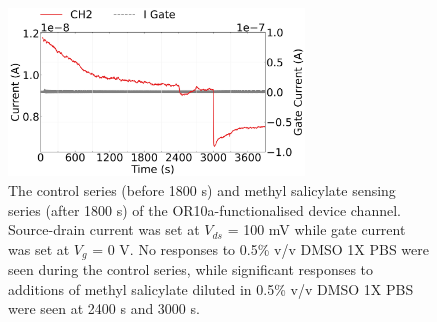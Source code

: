 \documentclass[
  a4paper,
]{scrbook}
\begin{document}
\begin{figure}

{\centering \includegraphics[width=0.7\textwidth,height=\textheight]{figures/ch8/NTQ39C7_OR10avihis_MeSalsensing_240403.png}

}

\caption{\label{fig-MeSal-sensing}The control series (before 1800 s) and
methyl salicylate sensing series (after 1800 s) of the
OR10a-functionalised device channel. Source-drain current was set at
\(V_{ds}\) = 100 mV while gate current was set at \(V_g\) = 0 V. No
responses to 0.5\% v/v DMSO 1X PBS were seen during the control series,
while significant responses to additions of methyl salicylate diluted in
0.5\% v/v DMSO 1X PBS were seen at 2400 s and 3000 s.}

\end{figure}
\end{document}
